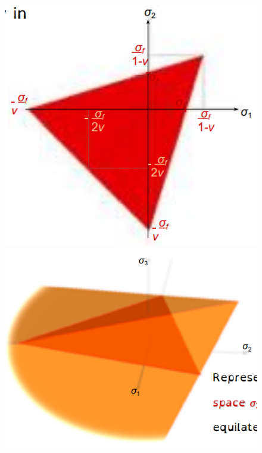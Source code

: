 \documentclass[class=report, crop=false, 12pt,a4paper]{standalone}
\begin{document}
\begin{figure}
  \begin{center}
    \begin{minipage}[b]{0.46\textwidth}
      \centering
      \includegraphics[width = \textwidth]{../img/diagram81.png}
      \caption{}
    \end{minipage}
    \begin{minipage}[b]{0.46\textwidth}
      \centering
      \includegraphics[width = \textwidth]{../img/diagram82.png}
      \caption{}
    \end{minipage}
  \end{center}
\end{figure}
\end{document}
